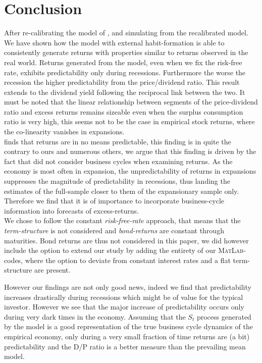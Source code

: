 \clearpage
\section{Conclusion} \label{sec:Conclusion}
After re-calibrating the model of \citet{Campbell1999}, and simulating from the recalibrated model. We have shown how the model with external habit-formation is able to consistently generate returns with properties similar to returns observed in the real world. Returns generated from the model, even when we fix the risk-free rate, exhibits predictability only during recessions. Furthermore the worse the recession the higher predictability from the price/dividend ratio. This result extends to the dividend yield following the reciprocal link between the two. It must be noted that the linear relationship between segments of the price-dividend ratio and excess returns remains sizeable even when the surplus consumption ratio is very high, this seems not to be the case in empirical stock returns, where the co-linearity vanishes in expansions.
\\

\citet{Goyal2004} finds that returns are in no means predictable, this finding is in quite the contrary to ours and numerous others, we argue that this finding is driven by the fact that \citet{Goyal2004} did not consider business cycles when examining returns. As the economy is most often in expansion, the unpredictability of returns in expansions suppresses the magnitude of predictability in recessions, thus landing the estimates of the full-sample closer to them of the expansionary sample only. Therefore we find that it is of importance to incorporate business-cycle information into forecasts of excess-returns.
\\


We chose to follow the constant \textit{risk-free-rate} approach, that means that the \textit{term-structure} is not considered and \textit{bond-returns} are constant through maturities. Bond returns are thus not considered in this paper, we did however include the option to extend our study by adding the entirety of our \textsc{MatLab}-codes, where the option to deviate from constant interest rates and a flat term-structure are present.

However our findings are not only good news, indeed we find that predictability increases drastically  during recessions which might be of value for the typical investor. However we see that the  major increase of predictability occurs only during very dark times in the economy. Assuming that the $S_t$ process generated by the model is a good representation of the true business cycle dynamics of the empirical economy, only during a very small fraction of time returns are (a bit) predictability and the D/P ratio is a better measure than the prevailing mean model.



